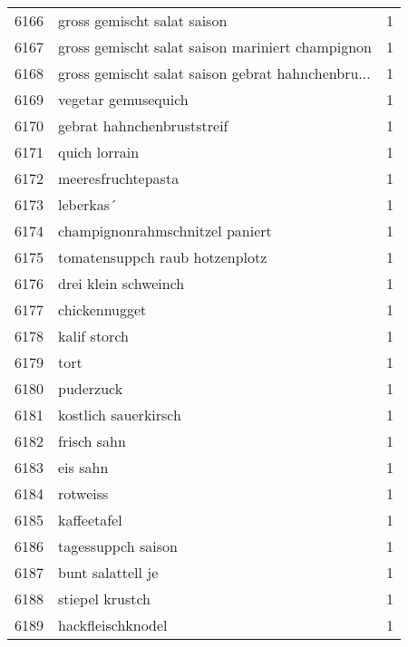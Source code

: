 \begin{tabular}{llr}
6166 &                        gross gemischt salat saison &      1 \\
6167 &   gross gemischt salat saison mariniert champignon &      1 \\
6168 &  gross gemischt salat saison gebrat hahnchenbru... &      1 \\
6169 &                                vegetar gemusequich &      1 \\
6170 &                         gebrat hahnchenbruststreif &      1 \\
6171 &                                      quich lorrain &      1 \\
6172 &                                 meeresfruchtepasta &      1 \\
6173 &                                          leberkas´ &      1 \\
6174 &                    champignonrahmschnitzel paniert &      1 \\
6175 &                     tomatensuppch raub hotzenplotz &      1 \\
6176 &                               drei klein schweinch &      1 \\
6177 &                                      chickennugget &      1 \\
6178 &                                       kalif storch &      1 \\
6179 &                                               tort &      1 \\
6180 &                                          puderzuck &      1 \\
6181 &                               kostlich sauerkirsch &      1 \\
6182 &                                        frisch sahn &      1 \\
6183 &                                           eis sahn &      1 \\
6184 &                                           rotweiss &      1 \\
6185 &                                        kaffeetafel &      1 \\
6186 &                                 tagessuppch saison &      1 \\
6187 &                                  bunt salattell je &      1 \\
6188 &                                    stiepel krustch &      1 \\
6189 &                                  hackfleischknodel &      1 \\

\end{tabular}
